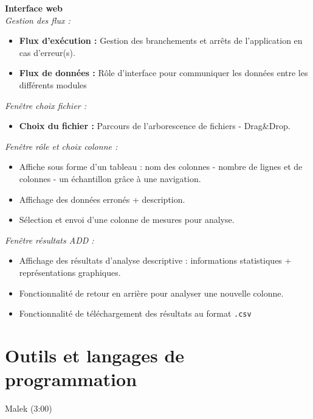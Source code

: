 	\begin{frame}
		\textbf{Interface web}\\
		\textit{Gestion des flux :}
		\begin{itemize}
			\item \textbf{Flux d'exécution :} Gestion des branchements et arrêts de l'application en cas d'erreur(s).
			\item \textbf{Flux de données :} Rôle d'interface pour communiquer les données entre les différents modules
		\end{itemize} \pause
		 \vspace{1cm}
		 
		\textit{Fenêtre choix fichier :}
		\begin{itemize}
			\item \textbf{Choix du fichier :} Parcours de l'arborescence de fichiers - Drag\&Drop.
		\end{itemize}
	\end{frame}
	
	\begin{frame}
		\textit{Fenêtre rôle et choix colonne :}
		\begin{itemize}
		\item Affiche sous forme d'un tableau : nom des colonnes - nombre de lignes et de colonnes - un échantillon grâce à une navigation.
		\item Affichage des données erronés + description.
		\item Sélection et envoi d'une colonne de mesures pour analyse. 
		\end{itemize} \pause
		 \vspace{1cm}
		 
		\textit{Fenêtre résultats ADD :}
		\begin{itemize}
		\item Affichage des résultats d'analyse descriptive : informations statistiques + représentations graphiques.
		\item Fonctionnalité de retour en arrière pour analyser une nouvelle colonne.
		\item Fonctionnalité de téléchargement des résultats au format \lstinline!.csv!
		\end{itemize}
	\end{frame}
	
	\section{Outils et langages de programmation}
		\begin{frame}
			Malek (3:00)
		\end{frame}
	
